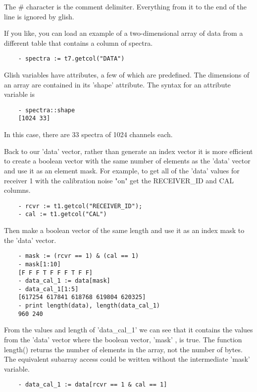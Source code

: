 The \# character is the comment delimiter.  Everything from it to the end of
the line is ignored by glish.

    If you like, you can load an example of a two-dimensional array of data
from a different table that contains a column of spectra.

\begin{verbatim}
	- spectra := t7.getcol("DATA")
\end{verbatim}

    Glish variables have attributes, a few of which are predefined.  The
dimensions of an array are contained in its 'shape' attribute.  The syntax
for an attribute variable is

\begin{verbatim}
	- spectra::shape
	[1024 33]
\end{verbatim}

In this case, there are 33 spectra of 1024 channels each.

    Back to our 'data' vector, rather than generate an index vector it is
more efficient to create a boolean vector with the same number of elements
as the 'data' vector and use it as an element mask.  For example, to get
all of the 'data' values for receiver 1 with the calibration noise "on" get
the RECEIVER\_ID and CAL columns.

\begin{verbatim}
	- rcvr := t1.getcol("RECEIVER_ID");
	- cal := t1.getcol("CAL")
\end{verbatim}

Then make a boolean vector of the same length and use it as an index mask
to the 'data' vector.

\begin{verbatim}
	- mask := (rcvr == 1) & (cal == 1)
	- mask[1:10]
	[F F F T F F F T F F]  
	- data_cal_1 := data[mask]
	- data_cal_1[1:5]
	[617254 617841 618768 619804 620325]
	- print length(data), length(data_cal_1)
	960 240
\end{verbatim}

From the values and length of 'data\_cal\_1' we can see that it contains the
values from the 'data' vector where the boolean vector, 'mask' , is true.
The function length() returns the number of elements in the array, not the
number of bytes.  The equivalent subarray access could be written without
the intermediate 'mask' variable.

\begin{verbatim}
	- data_cal_1 := data[rcvr == 1 & cal == 1]
\end{verbatim}


